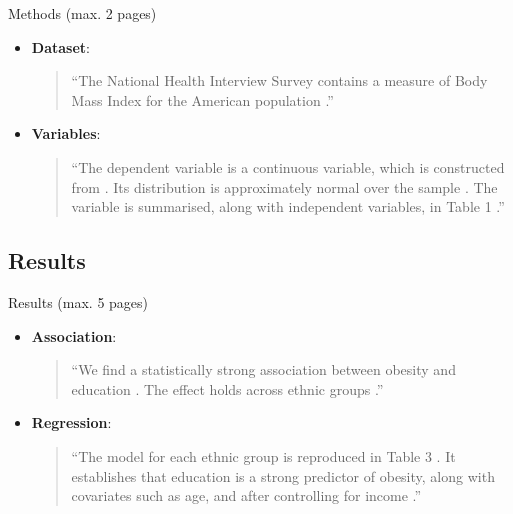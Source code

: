 \documentclass[t]{beamer}
\begin{document}
	\begin{frame}[t]{Methods (max. 2 pages)}

		\begin{itemize}
			\item \textbf{Dataset}: \\
			\begin{quote}``The  National Health Interview Survey  contains a measure of Body Mass Index for the American population .''\end{quote}

			\item \textbf{Variables}: \\
			\begin{quote}``The dependent variable is a continuous variable, which is constructed from . Its distribution is approximately normal over the sample . The variable is summarised, along with independent variables, in Table 1 .''\end{quote}
		\end{itemize}

	\end{frame}

	\subsection{Results}
	
	\begin{frame}[t]{Results (max. 5 pages)}

		\begin{itemize}
			\item \textbf{Association}: \\
			
			\begin{quote}``We find a statistically strong association between obesity and education . The effect holds across ethnic groups .''
			\end{quote}

			\item \textbf{Regression}: \\
			\begin{quote}``The model for each ethnic group is reproduced in Table 3 . It establishes that education is a strong predictor of obesity, along with covariates such as age, and after controlling for income .''\end{quote}
		\end{itemize}

	\end{frame}
\end{document}
